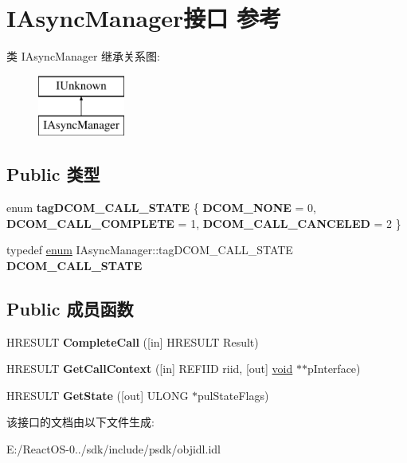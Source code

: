 \hypertarget{interface_i_async_manager}{}\section{I\+Async\+Manager接口 参考}
\label{interface_i_async_manager}
类 I\+Async\+Manager 继承关系图\+:\begin{figure}[H]
\begin{center}
\leavevmode
\includegraphics[height=2.000000cm]{interface_i_async_manager}
\end{center}
\end{figure}
\subsection*{Public 类型}
\begin{DoxyCompactItemize}
\item 
\mbox{\label{interface_i_async_manager_a15878f49944f3b60b2afa1a04147db0f}} 
enum {\bfseries tag\+D\+C\+O\+M\+\_\+\+C\+A\+L\+L\+\_\+\+S\+T\+A\+TE} \{ {\bfseries D\+C\+O\+M\+\_\+\+N\+O\+NE} = 0, 
{\bfseries D\+C\+O\+M\+\_\+\+C\+A\+L\+L\+\_\+\+C\+O\+M\+P\+L\+E\+TE} = 1, 
{\bfseries D\+C\+O\+M\+\_\+\+C\+A\+L\+L\+\_\+\+C\+A\+N\+C\+E\+L\+ED} = 2
 \}
\item 
\mbox{\label{interface_i_async_manager_a4b5b353d7b82e8589a8a7df0c500a42c}} 
typedef \hyperlink{interfaceenum}{enum} I\+Async\+Manager\+::tag\+D\+C\+O\+M\+\_\+\+C\+A\+L\+L\+\_\+\+S\+T\+A\+TE {\bfseries D\+C\+O\+M\+\_\+\+C\+A\+L\+L\+\_\+\+S\+T\+A\+TE}
\end{DoxyCompactItemize}
\subsection*{Public 成员函数}
\begin{DoxyCompactItemize}
\item 
\mbox{\label{interface_i_async_manager_a212ce017e61e6f7d20cd163f80da4e9b}} 
H\+R\+E\+S\+U\+LT {\bfseries Complete\+Call} (\mbox{[}in\mbox{]} H\+R\+E\+S\+U\+LT Result)
\item 
\mbox{\label{interface_i_async_manager_a35dcd0b8377fd806638464002b3e1cf7}} 
H\+R\+E\+S\+U\+LT {\bfseries Get\+Call\+Context} (\mbox{[}in\mbox{]} R\+E\+F\+I\+ID riid, \mbox{[}out\mbox{]} \hyperlink{interfacevoid}{void} $\ast$$\ast$p\+Interface)
\item 
\mbox{\label{interface_i_async_manager_a3333a3b818505900332e2678d5a7a611}} 
H\+R\+E\+S\+U\+LT {\bfseries Get\+State} (\mbox{[}out\mbox{]} U\+L\+O\+NG $\ast$pul\+State\+Flags)
\end{DoxyCompactItemize}


该接口的文档由以下文件生成\+:\begin{DoxyCompactItemize}
\item 
E\+:/\+React\+O\+S-\/0../sdk/include/psdk/objidl.\+idl\end{DoxyCompactItemize}
